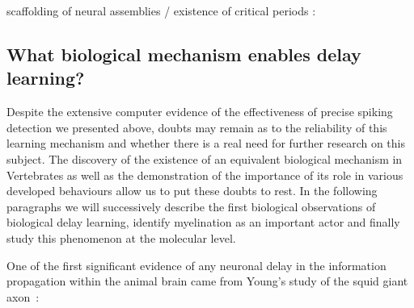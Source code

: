 \documentclass[brainsci, %
               review,submit,pdftex,moreauthors
               ]{Definitions/mdpi}
\begin{document}
scaffolding of neural assemblies / existence of critical periods :~\citep{dard_rapid_2022}

\subsection{What biological mechanism enables delay learning?}

Despite the extensive computer evidence of the effectiveness of precise spiking detection we presented above, doubts may remain as to the reliability of this learning mechanism and whether there is a real need for further research on this subject. The discovery of the existence of an equivalent biological mechanism in Vertebrates as well as the demonstration of the importance of its role in various developed behaviours allow us to put these doubts to rest. In the following paragraphs we will successively describe the first biological observations of biological delay learning, identify myelination as an important actor and finally study this phenomenon at the molecular level. 


One of the first significant evidence of any neuronal delay in the information propagation within the animal brain came from Young's study of the squid giant axon~\cite{young_1938}:
\end{document}
